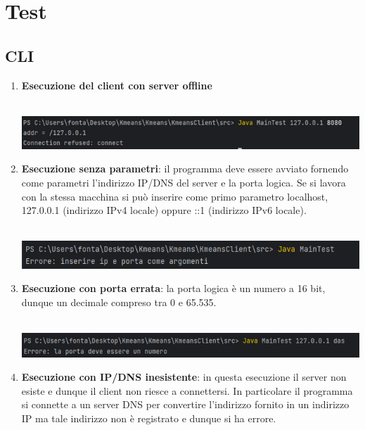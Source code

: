 \section{Test}
\subsection{CLI}
\begin{enumerate}
  \item \textbf{Esecuzione del client con server offline} \\ \\
  \begin{minipage}[t]{0.3\textwidth}
    \includegraphics[scale=0.8]{img/test1.png}
  \end{minipage}
  \item \textbf{Esecuzione senza parametri}: il programma deve essere avviato fornendo come parametri l'indirizzo IP/DNS del server e la porta logica. Se si lavora con la stessa macchina si può inserire come primo parametro localhost, 127.0.0.1 (indirizzo IPv4 locale) oppure ::1 (indirizzo IPv6 locale). \\ \\
  \begin{minipage}[t]{0.3\textwidth}
    \includegraphics[scale=0.8]{img/test2.png}
  \end{minipage}
  \item \textbf{Esecuzione con porta errata}: la porta logica è un numero a 16 bit, dunque un decimale compreso tra 0 e 65.535. \\ \\
  \begin{minipage}[t]{0.3\textwidth}
    \includegraphics[scale=0.8]{img/test3.png}
  \end{minipage}
  \item \textbf{Esecuzione con IP/DNS inesistente}: in questa esecuzione il server non esiste e dunque il client non riesce a connettersi. In particolare il programma si connette a un server DNS per convertire l'indirizzo fornito in un indirizzo IP ma tale indirizzo non è registrato e dunque si ha errore. \\ \\

\end{enumerate}

